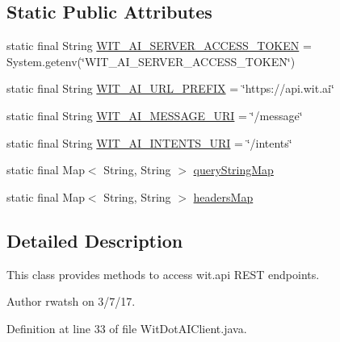 \subsection*{Static Public Attributes}
\begin{DoxyCompactItemize}
\item 
static final String \hyperlink{classedu_1_1sjsu_1_1amigo_1_1chatbot_1_1nlp_1_1_wit_dot_a_i_client_abbc6e1b12e9d2831b4fa429fb225f60c}{W\+I\+T\+\_\+\+A\+I\+\_\+\+S\+E\+R\+V\+E\+R\+\_\+\+A\+C\+C\+E\+S\+S\+\_\+\+T\+O\+K\+EN} = System.\+getenv(\char`\"{}W\+I\+T\+\_\+\+A\+I\+\_\+\+S\+E\+R\+V\+E\+R\+\_\+\+A\+C\+C\+E\+S\+S\+\_\+\+T\+O\+K\+EN\char`\"{})
\item 
static final String \hyperlink{classedu_1_1sjsu_1_1amigo_1_1chatbot_1_1nlp_1_1_wit_dot_a_i_client_acf5441b45c830893cbc1240b851d63d0}{W\+I\+T\+\_\+\+A\+I\+\_\+\+U\+R\+L\+\_\+\+P\+R\+E\+F\+IX} = \char`\"{}https\+://api.\+wit.\+ai\char`\"{}
\item 
static final String \hyperlink{classedu_1_1sjsu_1_1amigo_1_1chatbot_1_1nlp_1_1_wit_dot_a_i_client_addcdbbb805e8dd20855e5ecfc4ea2e68}{W\+I\+T\+\_\+\+A\+I\+\_\+\+M\+E\+S\+S\+A\+G\+E\+\_\+\+U\+RI} = \char`\"{}/message\char`\"{}
\item 
static final String \hyperlink{classedu_1_1sjsu_1_1amigo_1_1chatbot_1_1nlp_1_1_wit_dot_a_i_client_aba88d4b271eeb632f9649baa4705ca0e}{W\+I\+T\+\_\+\+A\+I\+\_\+\+I\+N\+T\+E\+N\+T\+S\+\_\+\+U\+RI} = \char`\"{}/intents\char`\"{}
\item 
static final Map$<$ String, String $>$ \hyperlink{classedu_1_1sjsu_1_1amigo_1_1chatbot_1_1nlp_1_1_wit_dot_a_i_client_af6a6aaec649d55ee99c38bf8208ebf41}{query\+String\+Map}
\item 
static final Map$<$ String, String $>$ \hyperlink{classedu_1_1sjsu_1_1amigo_1_1chatbot_1_1nlp_1_1_wit_dot_a_i_client_afef31f6223540020a9dcd39547e9a0e0}{headers\+Map}
\end{DoxyCompactItemize}


\subsection{Detailed Description}
This class provides methods to access wit.\+api R\+E\+ST endpoints.

\begin{DoxyAuthor}{Author}
rwatsh on 3/7/17. 
\end{DoxyAuthor}


Definition at line 33 of file Wit\+Dot\+A\+I\+Client.\+java.




